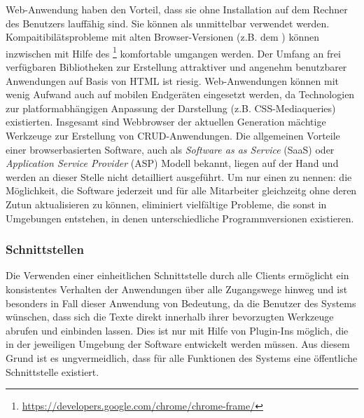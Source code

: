 Web-Anwendung haben den Vorteil, dass sie ohne Installation auf dem Rechner des Benutzers lauffähig sind. Sie können als unmittelbar verwendet werden. Kompaitibilätsprobleme mit alten Browser-Versionen (z.B. dem ) können inzwischen mit Hilfe des \footnote{\url{https://developers.google.com/chrome/chrome-frame/}} komfortable umgangen werden. Der Umfang an frei verfügbaren Bibliotheken zur Erstellung attraktiver und angenehm benutzbarer Anwendungen auf Basis von HTML ist riesig. Web-Anwendungen können mit wenig Aufwand auch auf mobilen Endgeräten eingesetzt werden, da Technologien zur platformabhängigen Anpassung der Darstellung (z.B. CSS-Mediaqueries) existierten. Insgesamt sind Webbrowser der aktuellen Generation mächtige Werkzeuge zur Erstellung von CRUD-Anwendungen. \cite{ms-key-software-development-trends} Die allgemeinen Vorteile einer browserbasierten Software, auch als \emph{Software as as Service} (SaaS) oder \emph{Application Service Provider} (ASP) Modell bekannt, liegen auf der Hand und werden an dieser Stelle nicht detailliert ausgeführt. Um nur einen zu nennen: die Möglichkeit, die Software jederzeit und für alle Mitarbeiter gleichzeitg ohne deren Zutun aktualisieren zu können, eliminiert vielfältige Probleme, die sonst in Umgebungen entstehen, in denen unterschiedliche Programmversionen existieren.

\subsubsection{Schnittstellen} 

Die Verwenden einer einheitlichen Schnittstelle durch alle Clients ermöglicht ein konsistentes Verhalten der Anwendungen über alle Zugangswege hinweg und ist besonders in Fall dieser Anwendung von Bedeutung, da die Benutzer des Systems wünschen, dass sich die Texte direkt innerhalb ihrer bevorzugten Werkzeuge abrufen und einbinden lassen. Dies ist nur mit Hilfe von Plugin-Ins möglich, die in der jeweiligen Umgebung der Software entwickelt werden müssen. Aus diesem Grund ist es ungvermeidlich, dass für alle Funktionen des Systems eine öffentliche Schnittstelle existiert.

